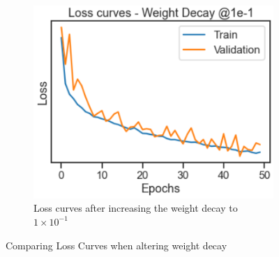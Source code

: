 \documentclass[a4paper, 12pt]{article}
\begin{document}
\begin{figure}[H]
\begin{subfigure}{.4\textwidth}
    \label{fig:wd1}
\end{subfigure} \hfill
\begin{subfigure}{.4\textwidth}
    \centering
    \includegraphics[width=1.1\textwidth, scale = 0.5]{Weightdecay2.PNG}
    \caption{Loss curves after increasing the weight decay to $1 \times 10^{-1}$}
    \label{fig:wd2}
\end{subfigure}%
\centering
\caption{Comparing Loss Curves when altering weight decay}

\end{figure}
\end{document}
